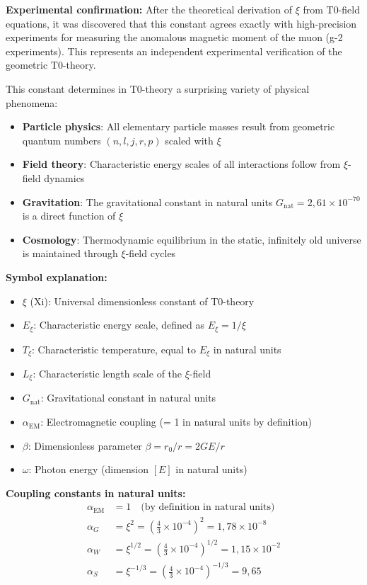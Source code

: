 	\textbf{Experimental confirmation:} After the theoretical derivation of $\xi$ from T0-field equations, it was discovered that this constant agrees exactly with high-precision experiments for measuring the anomalous magnetic moment of the muon (g-2 experiments). This represents an independent experimental verification of the geometric T0-theory.
	
	This constant determines in T0-theory a surprising variety of physical phenomena:
	\begin{itemize}
		\item \textbf{Particle physics}: All elementary particle masses result from geometric quantum numbers $(n,l,j,r,p)$ scaled with $\xi$
		\item \textbf{Field theory}: Characteristic energy scales of all interactions follow from $\xi$-field dynamics
		\item \textbf{Gravitation}: The gravitational constant in natural units $G_{\text{nat}} = 2{,}61 \times 10^{-70}$ is a direct function of $\xi$
		\item \textbf{Cosmology}: Thermodynamic equilibrium in the static, infinitely old universe is maintained through $\xi$-field cycles
	\end{itemize}
	
	\textbf{Symbol explanation:}
	\begin{itemize}
		\item $\xi$ (Xi): Universal dimensionless constant of T0-theory
		\item $E_\xi$: Characteristic energy scale, defined as $E_\xi = 1/\xi$
		\item $T_\xi$: Characteristic temperature, equal to $E_\xi$ in natural units
		\item $L_\xi$: Characteristic length scale of the $\xi$-field
		\item $G_{\text{nat}}$: Gravitational constant in natural units
		\item $\alpha_{\text{EM}}$: Electromagnetic coupling (= 1 in natural units by definition)
		\item $\beta$: Dimensionless parameter $\beta = r_0/r = 2GE/r$
		\item $\omega$: Photon energy (dimension $[E]$ in natural units)
	\end{itemize}
	
	\textbf{Coupling constants in natural units:}
	\begin{align}
		\alpha_{\text{EM}} &= 1 \quad \text{(by definition in natural units)} \\
		\alpha_G &= \xi^2 = \left(\frac{4}{3} \times 10^{-4}\right)^2 = 1{,}78 \times 10^{-8} \\
		\alpha_W &= \xi^{1/2} = \left(\frac{4}{3} \times 10^{-4}\right)^{1/2} = 1{,}15 \times 10^{-2} \\
		\alpha_S &= \xi^{-1/3} = \left(\frac{4}{3} \times 10^{-4}\right)^{-1/3} = 9{,}65
	\end{align}
	
